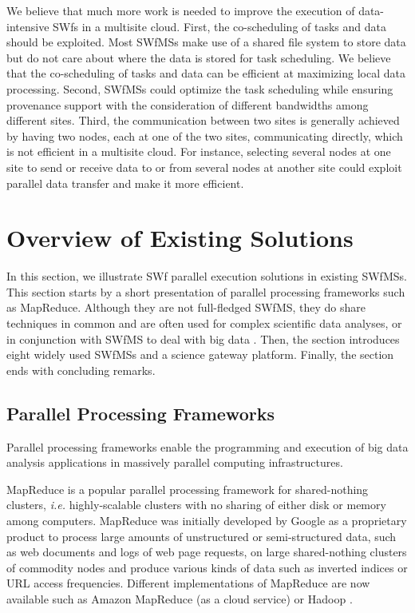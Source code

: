We believe that much more work is needed to improve the execution of
data-intensive SWfs in a multisite cloud.
First, the co-scheduling of tasks and data should be exploited.
Most SWfMSs make use of a shared file system to store data
but do not care about where the data is stored for task scheduling.
We believe that the co-scheduling of tasks and data can be efficient
at maximizing local data processing.
Second, SWfMSs could optimize the task scheduling while ensuring provenance support with the consideration of different bandwidths among different sites. 
Third, the communication between two sites is generally achieved by
having two nodes, each at one of the two sites, communicating
directly, which is not efficient in a multisite cloud. For instance, 
selecting several nodes at one site to send
or receive data to or from several nodes at another site could exploit
parallel data transfer and make it more efficient.




\section{Overview of Existing Solutions}
\label{sec:SOAOES}

In this section, we illustrate SWf parallel execution solutions in existing SWfMSs. 
This section starts by a short presentation of parallel
processing frameworks such as MapReduce. Although they are not
full-fledged SWfMS, they do share techniques in common and
are often used for complex scientific data analyses, or in conjunction
with SWfMS to deal with big data \cite{Wang2009}. Then, the section introduces eight widely used SWfMSs and a science gateway platform. Finally, the section ends with concluding remarks.

\subsection{Parallel Processing Frameworks}

Parallel processing frameworks enable the programming and execution of
big data analysis applications in massively parallel computing infrastructures.

MapReduce \cite{Dean2004} is a popular parallel processing framework
for shared-nothing clusters, \textit{i.e.} highly-scalable clusters with no sharing of either
disk or memory among computers.
MapReduce was initially developed by Google as a proprietary product
to process large amounts of unstructured or semi-structured data, such
as web documents and logs of web page requests, on large
shared-nothing clusters of commodity nodes and produce various kinds
of data such as inverted indices or URL access frequencies. Different
implementations of MapReduce are now available such as Amazon
MapReduce (as a cloud service) or Hadoop \cite{White2009}.

